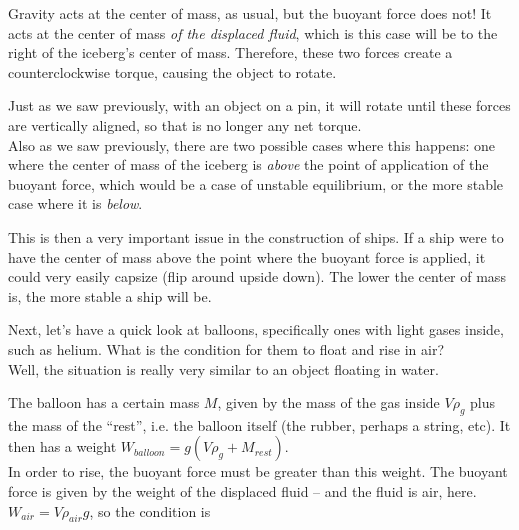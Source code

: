 \begin{figure}[H]
\centering
{}
\end{figure}

Gravity acts at the center of mass, as usual, but the buoyant force does not! It acts at the center of mass \emph{of the displaced fluid}, which is this case will be to the right of the iceberg's center of mass. Therefore, these two forces create a counterclockwise torque, causing the object to rotate.

Just as we saw previously, with an object on a pin, it will rotate until these forces are vertically aligned, so that is no longer any net torque.\\
Also as we saw previously, there are two possible cases where this happens: one where the center of mass of the iceberg is \emph{above} the point of application of the buoyant force, which would be a case of unstable equilibrium, or the more stable case where it is \emph{below}.

This is then a very important issue in the construction of ships. If a ship were to have the center of mass above the point where the buoyant force is applied, it could very easily capsize (flip around upside down). The lower the center of mass is, the more stable a ship will be.

Next, let's have a quick look at balloons, specifically ones with light gases inside, such as helium. What is the condition for them to float and rise in air?\\
Well, the situation is really very similar to an object floating in water.

The balloon has a certain mass $M$, given by the mass of the gas inside $V \rho_g$ plus the mass of the ``rest'', i.e. the balloon itself (the rubber, perhaps a string, etc). It then has a weight $W_{balloon} = g(V \rho_g + M_{rest})$.\\
In order to rise, the buoyant force must be greater than this weight. The buoyant force is given by the weight of the displaced fluid -- and the fluid is air, here. $W_{air} = V \rho_{air} g$, so the condition is

